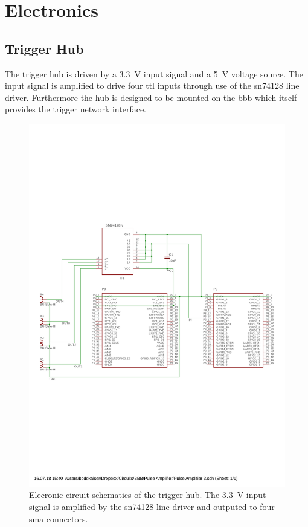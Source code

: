 \chapter{Electronics}

\section{Trigger Hub}
\label{app:electronics:trigger_hub}

The trigger hub is driven by a \SI{3.3}{\volt} input signal and a
\SI{5}{\volt} voltage source. The input signal is amplified to drive four
\gls{ttl} inputs through use of the \gls{sn74128} \cite{SN74128} line driver.
Furthermore the hub is designed to be mounted on the \gls{bbb} which itself
provides the trigger network interface.

\begin{figure}[h]
  \centering
  \captionsetup{width=.8\textwidth}
  \includegraphics[width=\textwidth]{images/circuit/line-driver/scheme.pdf}
  \caption{Elecronic circuit schematics of the trigger hub. The
    \SI{3.3}{\volt} input signal is amplified by the \gls{sn74128} line
    driver and outputed to four \gls{sma} connectors.}
\end{figure}

